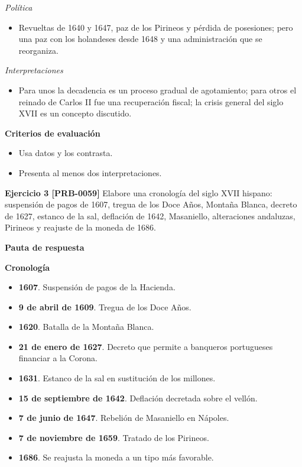 \documentclass{book}
\begin{document}
\noindent\textit{Política}
\begin{itemize}
\item Revueltas de 1640 y 1647, paz de los Pirineos y pérdida de posesiones; pero una paz con los holandeses desde 1648 y una administración que se reorganiza.
\end{itemize}

\noindent\textit{Interpretaciones}
\begin{itemize}
\item Para unos la decadencia es un proceso gradual de agotamiento; para otros el reinado de Carlos II fue una recuperación fiscal; la crisis general del siglo XVII es un concepto discutido.
\end{itemize}

\noindent\textbf{Criterios de evaluación}
\begin{itemize}
\item Usa datos y los contrasta.
\item Presenta al menos dos interpretaciones.
\end{itemize}

\noindent\textbf{Ejercicio 3 [PRB-0059]}
Elabore una cronología del siglo XVII hispano: suspensión de pagos de 1607, tregua de los Doce Años, Montaña Blanca, decreto de 1627, estanco de la sal, deflación de 1642, Masaniello, alteraciones andaluzas, Pirineos y reajuste de la moneda de 1686.


\noindent\textbf{Pauta de respuesta}

\noindent\textbf{Cronología}
\begin{itemize}
\item \textbf{1607}. Suspensión de pagos de la Hacienda.
\item \textbf{9 de abril de 1609}. Tregua de los Doce Años.
\item \textbf{1620}. Batalla de la Montaña Blanca.
\item \textbf{21 de enero de 1627}. Decreto que permite a banqueros portugueses financiar a la Corona.
\item \textbf{1631}. Estanco de la sal en sustitución de los millones.
\item \textbf{15 de septiembre de 1642}. Deflación decretada sobre el vellón.
\item \textbf{7 de junio de 1647}. Rebelión de Masaniello en Nápoles.
\item \textbf{7 de noviembre de 1659}. Tratado de los Pirineos.
\item \textbf{1686}. Se reajusta la moneda a un tipo más favorable.
\end{itemize}
\end{document}
